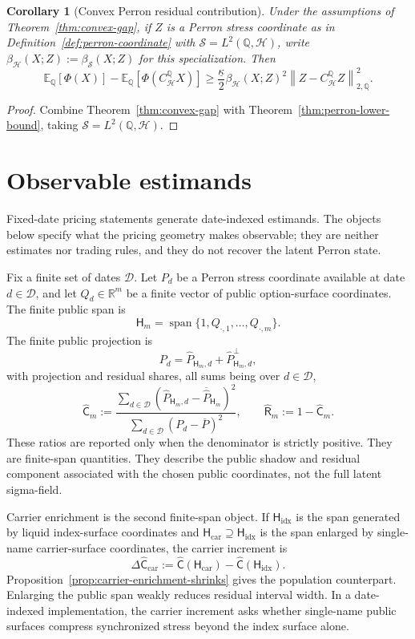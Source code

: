 \documentclass[11pt,a4paper]{amsart}
\theoremstyle{plain}
\newtheorem{corollary}[theorem]{Corollary}
\theoremstyle{definition}
\theoremstyle{remark}
\DeclareMathOperator{\Span}{span}
\newcommand{\R}{\mathbb{R}}
\newcommand{\QQ}{\mathbb{Q}}
\newcommand{\EE}{\mathbb{E}}
\newcommand{\cD}{\mathcal{D}}
\newcommand{\cH}{\mathcal{H}}
\newcommand{\cS}{\mathcal{S}}
\newcommand{\norm}[1]{\left\lVert #1\right\rVert}
\begin{document}
\begin{corollary}[Convex Perron residual contribution]\label{cor:convex-perron}
Under the assumptions of Theorem~\ref{thm:convex-gap}, if \(Z\) is a Perron stress coordinate as in
Definition~\ref{def:perron-coordinate} with \(\cS=L^2(\QQ,\cH)\), write
\(\beta_{\cH}(X;Z):=\beta_{\cS}(X;Z)\) for this specialization.  Then
\[
        \EE_\QQ[\Phi(X)]
        -
        \EE_\QQ[\Phi(C_{\cH}^{\QQ}X)]
        \ge
        \frac{\underline\kappa}{2}
        \beta_{\cH}(X;Z)^2
        \norm{Z-C_{\cH}^{\QQ}Z}_{2,\QQ}^2.
\]
\end{corollary}

\begin{proof}
Combine Theorem~\ref{thm:convex-gap} with Theorem~\ref{thm:perron-lower-bound}, taking
\(\cS=L^2(\QQ,\cH)\).
\end{proof}

\section{Observable estimands}\label{sec:observable}

Fixed-date pricing statements generate date-indexed estimands.  The objects below specify what the
pricing geometry makes observable; they are neither estimates nor trading rules, and they do not
recover the latent Perron state.

Fix a finite set of dates \(\cD\).  Let \(P_d\) be a Perron stress coordinate available
at date \(d\in\cD\), and let \(Q_d\in\R^m\) be a finite vector of public option-surface
coordinates.  The finite public span is
\[
        \mathsf H_m=\Span\{1,Q_{\cdot,1},\ldots,Q_{\cdot,m}\}.
\]
The finite public projection is
\[
        P_d=\widehat P_{\mathsf H_m,d}+\widehat P^{\perp}_{\mathsf H_m,d},
\]
with projection and residual shares, all sums being over \(d\in\cD\),
\[
        \widehat{\mathsf C}_m
        :=
        \frac{\sum_{d\in\cD}(\widehat P_{\mathsf H_m,d}-\overline{\widehat P}_{\mathsf H_m})^2}
             {\sum_{d\in\cD}(P_d-\overline P)^2},
        \qquad
        \widehat{\mathsf R}_m:=1-\widehat{\mathsf C}_m.
\]
These ratios are reported only when the denominator is strictly positive.  They are finite-span
quantities.  They describe the public shadow and residual component associated with the chosen
public coordinates, not the full latent sigma-field.

Carrier enrichment is the second finite-span object.  If \(\mathsf H_{\mathrm{idx}}\) is the span
generated by liquid index-surface coordinates and
\(\mathsf H_{\mathrm{car}}\supseteq\mathsf H_{\mathrm{idx}}\) is the span enlarged by single-name
carrier-surface coordinates, the carrier increment is
\[
        \Delta\widehat{\mathsf C}_{\mathrm{car}}
        :=
        \widehat{\mathsf C}(\mathsf H_{\mathrm{car}})
        -
        \widehat{\mathsf C}(\mathsf H_{\mathrm{idx}}).
\]
Proposition~\ref{prop:carrier-enrichment-shrinks} gives the population counterpart.  Enlarging the
public span weakly reduces residual interval width.  In a date-indexed implementation, the carrier
increment asks whether single-name public surfaces compress synchronized stress beyond the index
surface alone.
\end{document}
